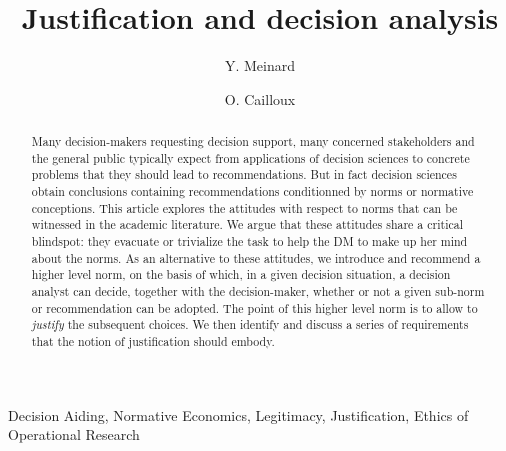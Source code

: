 \documentclass[preprint, french, english, 11pt, authoryear]{elsarticle}%
\begin{document}
\hypersetup{citecolor=black}
\title{Justification and decision analysis}

\author[ld]{Y. Meinard}
\author[ld]{O. Cailloux}
\address[ld]{Universit\'e Paris-Dauphine, PSL Research University, CNRS, UMR [7243], LAMSADE, 75016 PARIS, FRANCE}

\begin{abstract}
Many decision-makers requesting decision support, many concerned stakeholders and the general public typically expect from applications of decision sciences to concrete problems that they should lead to recommendations. But in fact decision sciences obtain conclusions containing recommendations conditionned by norms or normative conceptions. This article explores the attitudes with respect to norms that can be witnessed in the academic literature. We argue that these attitudes share a critical blindspot: they evacuate or trivialize the task to help the \ac{DM} to make up her mind about the norms. As an alternative to these attitudes, we introduce and recommend a higher level norm, on the basis of which, in a given decision situation, a decision analyst can decide, together with the decision-maker, whether or not a given sub-norm or recommendation can be adopted. The point of this higher level norm is to allow to \emph{justify} the subsequent choices. We then identify and discuss a series of requirements that the notion of justification should embody.
\end{abstract}

\begin{keyword}
Decision Aiding, Normative Economics, Legitimacy, Justification, Ethics of Operational Research
\end{keyword}

\maketitle
\end{document}
